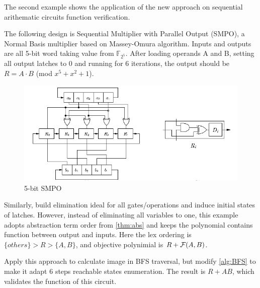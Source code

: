 The second example shows the application of the new approach on sequential 
arithematic circuits function verification.

\begin{Example}
\label{exp:multiplier}

The following design is Sequential Multiplier with Parallel Output (SMPO),
a Normal Basis multiplier based on Massey-Omura algorithm. Inputs and outputs
are all 5-bit word taking value from ${\mathbb F}_{2^5}$. After loading operands
 A and B, setting all output latches to 0 and running for 6 iterations, the 
output should be $R = A\cdot B$ (mod $x^5 + x^2 + 1$).
  \begin{figure}[hbt]
    \centerline{\includegraphics[scale=0.3]{./SMPO.png}}
    \caption{5-bit SMPO}
  \label{fig:SMPO}
  \end{figure}

Similarly, build elimination ideal for all gates/operations and induce
initial states of latches. However, instead of eliminating all variables
to one, this example adopts abstraction term order from \ref{thm:abs}
and keeps the polynomial contains function between output and inputs.
Here the lex ordering is $\{others\} > R > \{A, B\}$, and objective
polynimial is $R + {\mathcal{F}}(A, B)$. \par

Apply this approach to calculate image in BFS traversal, but modify 
\ref{alg:BFS} to make it adapt 6 steps reachable states enumeration.
The result is $R + AB$, which validates the function of this circuit.

\end{Example}
